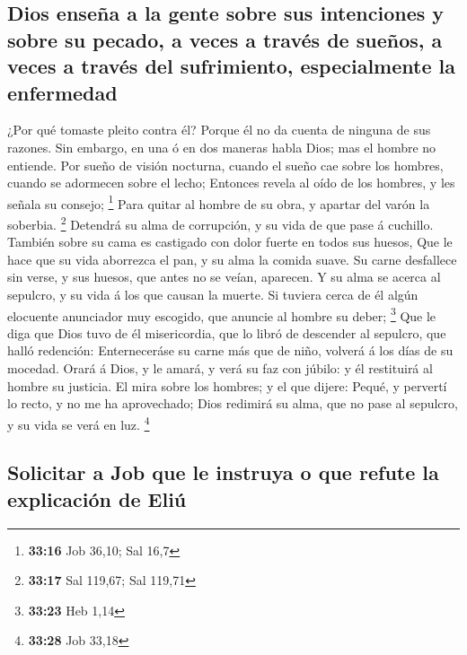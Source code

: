 \hypertarget{dios-enseuxf1a-a-la-gente-sobre-sus-intenciones-y-sobre-su-pecado-a-veces-a-travuxe9s-de-sueuxf1os-a-veces-a-travuxe9s-del-sufrimiento-especialmente-la-enfermedad}{%
\subsection{Dios enseña a la gente sobre sus intenciones y sobre su
pecado, a veces a través de sueños, a veces a través del sufrimiento,
especialmente la
enfermedad}\label{dios-enseuxf1a-a-la-gente-sobre-sus-intenciones-y-sobre-su-pecado-a-veces-a-travuxe9s-de-sueuxf1os-a-veces-a-travuxe9s-del-sufrimiento-especialmente-la-enfermedad}}

 ¿Por qué tomaste pleito contra él? Porque él no da cuenta
de ninguna de sus razones.  Sin embargo, en una ó en dos
maneras habla Dios; mas el hombre no entiende.  Por sueño
de visión nocturna, cuando el sueño cae sobre los hombres, cuando se
adormecen sobre el lecho;  Entonces revela al oído de los
hombres, y les señala su consejo; \footnote{\textbf{33:16} Job 36,10;
  Sal 16,7}  Para quitar al hombre de su obra, y apartar
del varón la soberbia. \footnote{\textbf{33:17} Sal 119,67; Sal 119,71}
 Detendrá su alma de corrupción, y su vida de que pase á
cuchillo.  También sobre su cama es castigado con dolor
fuerte en todos sus huesos,  Que le hace que su vida
aborrezca el pan, y su alma la comida suave.  Su carne
desfallece sin verse, y sus huesos, que antes no se veían, aparecen.
 Y su alma se acerca al sepulcro, y su vida á los que
causan la muerte.  Si tuviera cerca de él algún elocuente
anunciador muy escogido, que anuncie al hombre su deber; \footnote{\textbf{33:23}
  Heb 1,14}  Que le diga que Dios tuvo de él misericordia,
que lo libró de descender al sepulcro, que halló redención:
 Enterneceráse su carne más que de niño, volverá á los días
de su mocedad.  Orará á Dios, y le amará, y verá su faz con
júbilo: y él restituirá al hombre su justicia.  El mira
sobre los hombres; y el que dijere: Pequé, y pervertí lo recto, y no me
ha aprovechado;  Dios redimirá su alma, que no pase al
sepulcro, y su vida se verá en luz. \footnote{\textbf{33:28} Job 33,18}

\hypertarget{solicitar-a-job-que-le-instruya-o-que-refute-la-explicaciuxf3n-de-eliuxfa}{%
\subsection{Solicitar a Job que le instruya o que refute la explicación
de
Eliú}\label{solicitar-a-job-que-le-instruya-o-que-refute-la-explicaciuxf3n-de-eliuxfa}}

